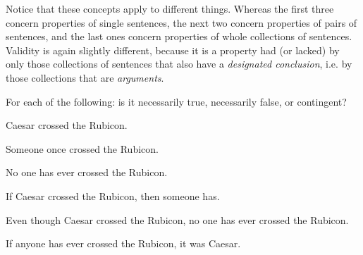 Notice that these concepts apply to different things. Whereas the first three concern properties of single sentences, the next two concern properties of pairs of sentences, and the last ones concern properties of whole collections of sentences.  Validity is again slightly different, because it is a property had (or lacked) by only those collections of sentences that also have a \emph{designated conclusion}, i.e. by those collections that are \emph{arguments}.    

\practiceproblems
\problempart
\label{pr.EnglishTautology}
For each of the following: is it necessarily true, necessarily false, or contingent?
\begin{earg}
\item Caesar crossed the Rubicon.
\item Someone once crossed the Rubicon.
\item No one has ever crossed the Rubicon.
\item If Caesar crossed the Rubicon, then someone has.
\item Even though Caesar crossed the Rubicon, no one has ever crossed the Rubicon.
\item If anyone has ever crossed the Rubicon, it was Caesar.
\end{earg}

